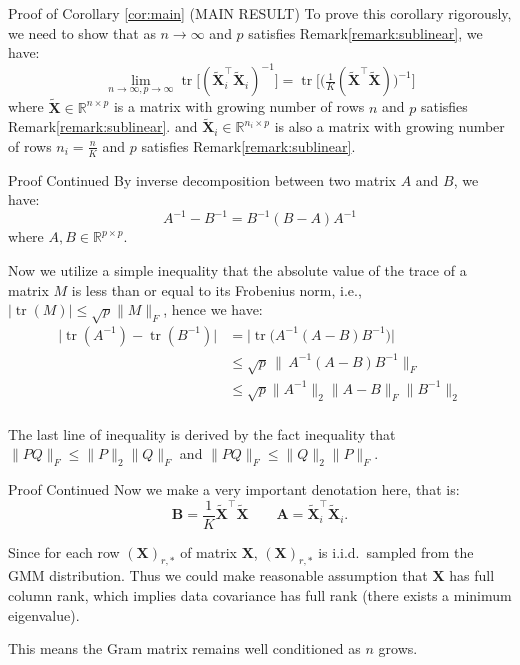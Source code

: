 \documentclass{beamer}
\theoremstyle{remark}
\begin{document}
\begin{frame}{Proof of Corollary \ref{cor:main} (MAIN RESULT)}
To prove this corollary rigorously, we need to show that as $n\to\infty$ and $p$ satisfies Remark\ref{remark:sublinear},
we have:
\[
\lim_{n\to\infty,p\to\infty}\operatorname{tr}\bigl[(\tilde{\mathbf{X}}_i^{\top}\tilde{\mathbf{X}}_i)^{-1}\bigr]
  = \operatorname{tr}\bigl[\bigl(\tfrac{1}{K}(\tilde{\mathbf{X}}^{\top}\tilde{\mathbf{X}})\bigr)^{-1}\bigr]
\]
where $\tilde{\mathbf{X}}\in\mathbb{R}^{n \times p}$ is a matrix with growing number of rows $n$ and $p$ satisfies Remark\ref{remark:sublinear}.
and $\tilde{\mathbf{X}}_i\in\mathbb{R}^{n_i \times p}$ is also a matrix with growing number of rows $n_i = \frac{n}{K}$ and $p$ satisfies Remark\ref{remark:sublinear}.
\end{frame}
\begin{frame}{Proof Continued}
By inverse decomposition between two matrix $A$ and $B$, we have:
\[
A^{-1} - B^{-1} = B^{-1}(B-A)A^{-1}\]
where $A, B \in \mathbb{R}^{p\times p}$.

Now we utilize a simple inequality that the absolute value of the trace of a matrix $M$ is less than or equal to its Frobenius norm, i.e., $\lvert\operatorname{tr}(M)\rvert\le\sqrt{p}\lVert M\rVert_{F}$, hence we have:
\begin{align*}
  \bigl|\operatorname{tr}(A^{-1}) - \operatorname{tr}(B^{-1})\bigr|
  &= \bigl|\operatorname{tr}\!\bigl(A^{-1}(A-B)B^{-1}\bigr)\bigr| \\[4pt]
  &\le \sqrt{p} \,\bigl\|\,A^{-1}(A-B)B^{-1}\bigr\|_{F}\\[4pt]
  &\leq \sqrt{p} \lVert A^{-1}\rVert_{2} \lVert A-B\rVert_{F} \lVert B^{-1}\rVert_{2} \\[4pt]
  \tag{4.0} \label{eq:4.0}
\end{align*}

The last line of inequality is derived by the fact inequality that $\lVert PQ\rVert_{F} \le \lVert P\rVert_{2}\lVert Q\rVert_{F}$ and $\lVert PQ\rVert_{F} \le \lVert Q\rVert_{2}\lVert P\rVert_{F}$.
\end{frame}
\begin{frame}{Proof Continued}
Now we make a very important denotation here, that is:
\[
 \mathbf{B} = \frac{1}{K} \tilde{\mathbf{X}}^{\top}\tilde{\mathbf{X}}  \qquad  \mathbf{A} = \tilde{\mathbf{X}}_i^{\top}\tilde{\mathbf{X}}_i.
\]

Since for each row $(\mathbf{X})_{r,*}$ of matrix $\mathbf{X}$, $(\mathbf{X})_{r,*}$ is i.i.d.\ sampled from the GMM distribution. Thus we could make reasonable assumption that $\mathbf{X}$ has full column rank, which implies data covariance has full rank (there exists a minimum eigenvalue).

This means the Gram matrix remains well conditioned as $n$ grows.
\end{frame}
\end{document}
